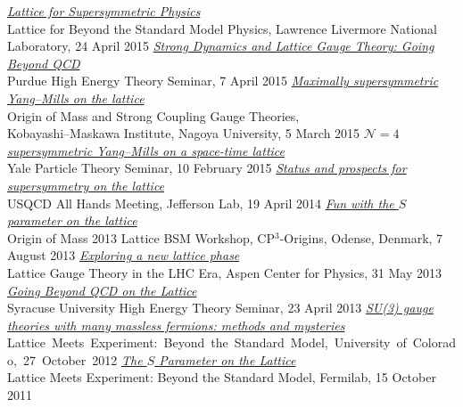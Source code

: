 \begin{spacelist}
\begin{revnumerate}
    \pagebreakitem
      \textit{\href{http://www.davidschaich.net/talks/Livermore1504.pdf}{Lattice for Supersymmetric Physics}} \\
      Lattice for Beyond the Standard Model Physics, Lawrence Livermore National Laboratory, 24 April 2015
    \pagebreakitem
      \textit{\href{http://www.davidschaich.net/talks/Purdue1504.pdf}{Strong Dynamics and Lattice Gauge Theory: Going Beyond QCD}} \\
      Purdue High Energy Theory Seminar, 7 April 2015
    \pagebreakitem
      \textit{\href{http://www.davidschaich.net/talks/SCGT15.pdf}{Maximally supersymmetric Yang--Mills on the lattice}} \\
      Origin of Mass and Strong Coupling Gauge Theories, \\ Kobayashi--Maskawa Institute, Nagoya University, 5 March 2015
    \pagebreakitem
      \textit{\href{http://www.davidschaich.net/talks/Yale1502.pdf}{$\mathcal N = 4$ supersymmetric Yang--Mills on a space-time lattice}} \\
      Yale Particle Theory Seminar, 10 February 2015
    \pagebreakitem
      \textit{\href{http://www.davidschaich.net/talks/USQCD14.pdf}{Status and prospects for supersymmetry on the lattice}} \\
      USQCD All Hands Meeting, Jefferson Lab, 19 April 2014
    \pagebreakitem
      \textit{\href{http://www.davidschaich.net/talks/Mass13.pdf}{Fun with the $S$ parameter on the lattice}} \\
      Origin of Mass 2013 Lattice BSM Workshop, CP$^3$-Origins, Odense, Denmark, 7 August 2013
    \pagebreakitem
      \textit{\href{http://www.davidschaich.net/talks/Aspen13.pdf}{Exploring a new lattice phase}} \\
      Lattice Gauge Theory in the LHC Era, Aspen Center for Physics, 31 May 2013
    \pagebreakitem
      \textit{\href{http://www.davidschaich.net/talks/SU1304.pdf}{Going Beyond QCD on the Lattice}} \\
      Syracuse University High Energy Theory Seminar, 23 April 2013
    \pagebreakitem
      \textit{\href{http://www.davidschaich.net/talks/LME2012.pdf}{SU(3) gauge theories with many massless fermions: methods and mysteries}} \\
      Lattice~Meets~Experiment:~Beyond~the~Standard~Model,~University~of~Colorado,~27~October~2012
    \pagebreakitem
      \textit{\href{http://www.davidschaich.net/talks/LME2011.pdf}{The $S$ Parameter on the Lattice}} \\
      Lattice Meets Experiment: Beyond the Standard Model, Fermilab, 15 October 2011

\end{revnumerate}
\end{spacelist}
